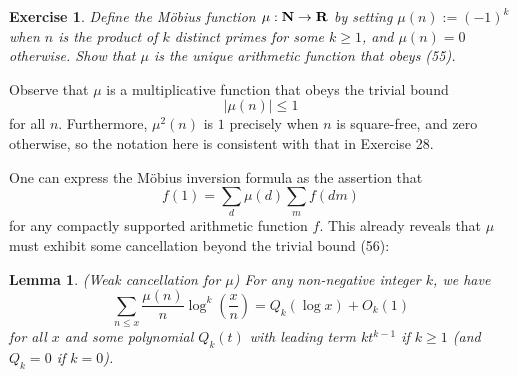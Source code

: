 \documentclass[10pt,reqno]{amsart}
\newtheorem{lemma}[theorem]{Lemma}
\newtheorem{exercise}[theorem]{Exercise}
\begin{document}
\begin{exercise}
    Define the \emph{Möbius function} $\mu: {\bf N} \rightarrow {\bf R}$ by setting $\mu(n) := (-1)^k$ when $n$ is the product of $k$ distinct primes for some $k \geq 1$, and $\mu(n)=0$ otherwise. Show that $\mu$ is the unique arithmetic function that obeys (55).
\end{exercise}

Observe that $\mu$ is a multiplicative function that obeys the trivial bound
%
\begin{equation}   |\mu(n)| \leq 1 \end{equation}
%
for all $n$. Furthermore, $\mu^2(n)$ is $1$ precisely when $n$ is square-free, and zero otherwise, so the notation here is consistent with that in Exercise 28.

One can express the Möbius inversion formula as the assertion that
%
\begin{equation}   f(1) = \sum_d \mu(d) \sum_m f(dm) \end{equation}
%
for any compactly supported arithmetic function $f$. This already reveals that $\mu$ must exhibit some cancellation beyond the trivial bound (56):

\begin{lemma} (Weak cancellation for $\mu$) For any non-negative integer $k$, we have
    \begin{equation}   \sum_{n \leq x} \frac{\mu(n)}{n} \log^k \left( \frac{x}{n} \right) = Q_k( \log x ) + O_k(1) \end{equation}
    for all $x$ and some polynomial $Q_k(t)$ with leading term $k t^{k-1}$ if $k \geq 1$ (and $Q_k=0$ if $k=0$).
\end{lemma}
\end{document}
